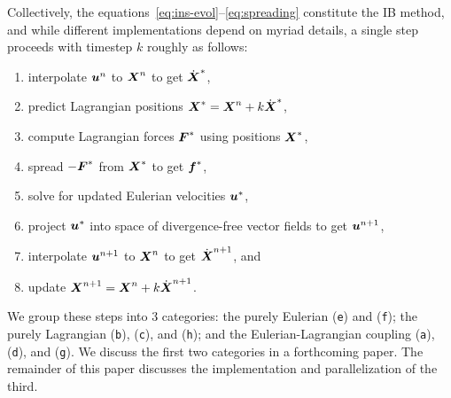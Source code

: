 Collectively, the equations~\eqref{eq:ins-evol}--\eqref{eq:spreading} constitute the
IB method, and while different implementations depend on myriad details, a single step
proceeds with timestep $k$ roughly as follows:
\begin{enumerate}[label=(\texttt{\alph*})]
    \item interpolate $\boldsymbol{u}^n$ to $\boldsymbol{X}^n$ to get $\dot{\boldsymbol{X}}^\ast$,
    \item predict Lagrangian positions $\boldsymbol{X}^\ast = \boldsymbol{X}^n + k\dot{\boldsymbol{X}}^\ast$,
    \item compute Lagrangian forces $\boldsymbol{F}^\ast$ using positions $\boldsymbol{X}^\ast$,
    \item spread $-\boldsymbol{F}^\ast$ from $\boldsymbol{X}^\ast$ to get $\boldsymbol{f}^\ast$,
    \item solve for updated Eulerian velocities $\boldsymbol{u}^\ast$,
    \item project $\boldsymbol{u}^\ast$ into space of divergence-free vector fields to get
        $\boldsymbol{u}^{n+1}$,
    \item interpolate $\boldsymbol{u}^{n+1}$ to $\boldsymbol{X}^n$ to get $\dot{\boldsymbol{X}}^{n+1}$, and
    \item update $\boldsymbol{X}^{n+1} = \boldsymbol{X}^n + k \dot{\boldsymbol{X}}^{n+1}$.
\end{enumerate}
We group these steps into 3 categories: the purely Eulerian (\texttt{e}) and
(\texttt{f}); the purely Lagrangian (\texttt{b}), (\texttt{c}), and (\texttt{h}); and the
Eulerian-Lagrangian coupling (\texttt{a}), (\texttt{d}), and (\texttt{g}). We discuss the
first two categories in a forthcoming paper. The remainder of this paper discusses the
implementation and parallelization of the third.


